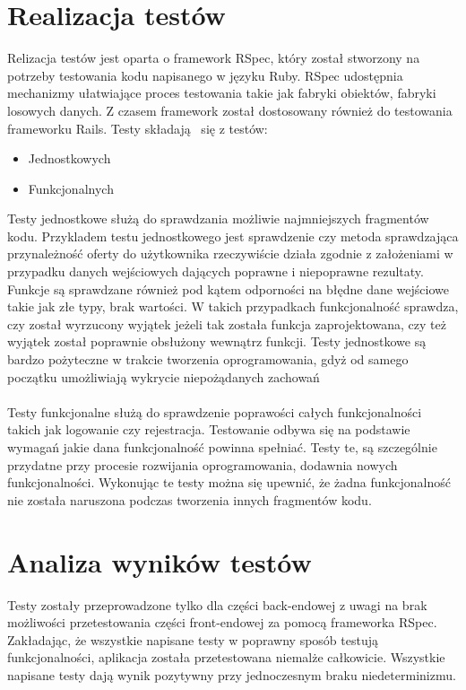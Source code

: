 \section{Realizacja testów}
Relizacja testów jest oparta o framework RSpec, który został stworzony na potrzeby testowania kodu napisanego w języku Ruby. RSpec udostępnia mechanizmy ułatwiające proces testowania takie jak fabryki obiektów, fabryki losowych danych. Z czasem framework został dostosowany również do testowania frameworku Rails. Testy składają  się z testów:
\begin{itemize}
\item Jednostkowych
\item Funkcjonalnych
\end{itemize}
Testy jednostkowe służą do sprawdzania możliwie najmniejszych fragmentów kodu. Przykladem testu jednostkowego jest sprawdzenie czy metoda sprawdzająca przynależność oferty do użytkownika rzeczywiście działa zgodnie z założeniami w przypadku danych wejściowych dających poprawne i niepoprawne rezultaty. Funkcje są sprawdzane również pod kątem odporności na błędne dane wejściowe takie jak złe typy, brak wartości. W takich przypadkach funkcjonalność sprawdza, czy został wyrzucony wyjątek jeżeli tak została funkcja zaprojektowana, czy też wyjątek został poprawnie obsłużony wewnątrz funkcji. Testy jednostkowe są bardzo pożyteczne w trakcie tworzenia oprogramowania, gdyż od samego początku umożliwiają wykrycie niepożądanych zachowań\\
\\
Testy funkcjonalne służą do sprawdzenie poprawości całych funkcjonalności takich jak logowanie czy rejestracja. Testowanie odbywa się na podstawie wymagań jakie dana funkcjonalność powinna spełniać. Testy te, są szczególnie przydatne przy procesie rozwijania oprogramowania, dodawnia nowych funkcjonalności. Wykonując te testy można się upewnić, że żadna funkcjonalność nie została naruszona podczas tworzenia innych fragmentów kodu.

\section{Analiza wyników testów}
Testy zostały przeprowadzone tylko dla części back-endowej z uwagi na brak możliwości przetestowania części front-endowej za pomocą frameworka RSpec. Zakładając, że wszystkie napisane testy w poprawny sposób testują funkcjonalności, aplikacja została przetestowana niemalże całkowicie. Wszystkie napisane testy dają wynik pozytywny przy jednoczesnym braku niedeterminizmu.
